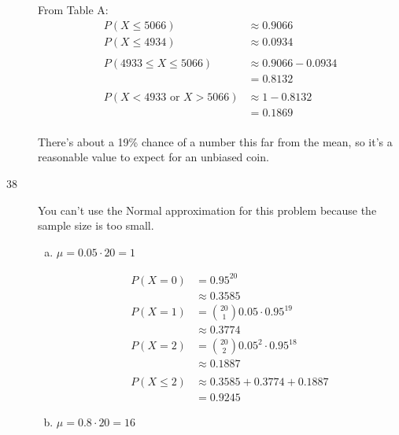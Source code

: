 \documentclass[letterpaper, landscape]{exam}
\begin{document}
\begin{description}
        From Table A\@:
        \begin{align*}
          P(X \leq 5066) & \approx 0.9066 \\
          P(X \leq 4934) & \approx 0.0934 \\
          \\
          P(4933 \leq X \leq 5066) & \approx 0.9066 - 0.0934 \\
                                   & =0.8132 \\
          \\
          P(X < 4933 \text{ or } X > 5066) & \approx 1 - 0.8132 \\
                                           & = 0.1869 \\
        \end{align*}

        There's about a 19\% chance of a number this far from the mean, so it's
        a reasonable value to expect for an unbiased coin.

      \item[38]
        You can't use the Normal approximation for this problem because the
        sample size is too small.

        \begin{enumerate}[(a)]
          \item 
            $\mu = 0.05 \cdot 20 = \boxed{ 1 }$

            \begin{align*}
              P(X = 0) & = 0.95^{20} \\
                       & \approx 0.3585 \\
              P(X = 1) & = \binom{20}{1} 0.05 \cdot 0.95^{19} \\
                       & \approx 0.3774 \\
              P(X = 2) & = \binom{20}{2} 0.05^2 \cdot 0.95^{18} \\
                       & \approx 0.1887 \\
                       \\
              P(X \leq 2) & \approx 0.3585 + 0.3774 + 0.1887 \\
                          & = \boxed{ 0.9245 }
            \end{align*}

          \item 
            $\mu = 0.8 \cdot 20 = \boxed{ 16 }$


\end{enumerate}
\end{description}
\end{document}
